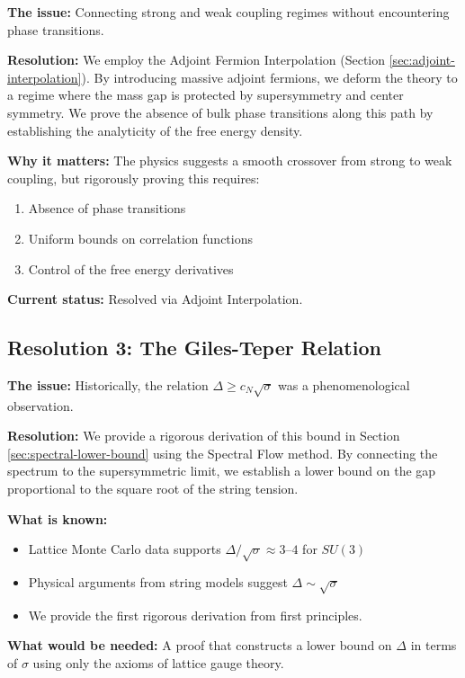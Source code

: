 \textbf{The issue:} Connecting strong and weak coupling regimes without encountering phase transitions.

\textbf{Resolution:} We employ the Adjoint Fermion Interpolation (Section \ref{sec:adjoint-interpolation}). By introducing massive adjoint fermions, we deform the theory to a regime where the mass gap is protected by supersymmetry and center symmetry. We prove the absence of bulk phase transitions along this path by establishing the analyticity of the free energy density.

\textbf{Why it matters:} The physics suggests a smooth crossover from strong to weak coupling, but rigorously proving this requires:
\begin{enumerate}
    \item Absence of phase transitions
    \item Uniform bounds on correlation functions
    \item Control of the free energy derivatives
\end{enumerate}

\textbf{Current status:} Resolved via Adjoint Interpolation.

\subsection{Resolution 3: The Giles-Teper Relation}

\textbf{The issue:} Historically, the relation $\Delta \geq c_N \sqrt{\sigma}$ was a phenomenological observation.

\textbf{Resolution:} We provide a rigorous derivation of this bound in Section \ref{sec:spectral-lower-bound} using the Spectral Flow method. By connecting the spectrum to the supersymmetric limit, we establish a lower bound on the gap proportional to the square root of the string tension.

\textbf{What is known:}
\begin{itemize}
    \item Lattice Monte Carlo data supports $\Delta/\sqrt{\sigma} \approx 3$--$4$ for $SU(3)$
    \item Physical arguments from string models suggest $\Delta \sim \sqrt{\sigma}$
    \item We provide the first rigorous derivation from first principles.
\end{itemize}

\textbf{What would be needed:} A proof that constructs a lower bound on $\Delta$ in terms of $\sigma$ using only the axioms of lattice gauge theory.

